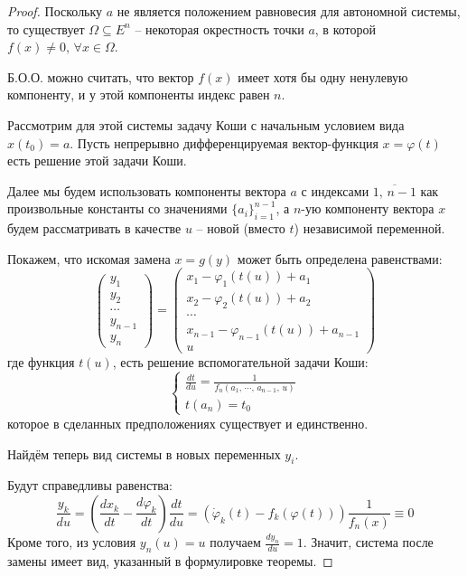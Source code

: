 \documentclass[a4paper,12pt]{article}
\renewcommand{\phi}{\ensuremath{\varphi}}
\theoremstyle{plain}
\theoremstyle{definition}
\theoremstyle{remark}
\begin{document}
\begin{proof}
	Поскольку $a$ не является положением равновесия для автономной системы, то существует $\Omega \subseteq E^n$ -- некоторая окрестность точки $a$, в которой $f(x) \neq 0,\, \forall x \in \Omega$.

	Б.О.О. можно считать, что вектор $f(x)$ имеет хотя бы одну ненулевую компоненту, и у этой компоненты индекс равен $n$.

	Рассмотрим для этой системы задачу Коши с начальным условием вида $x(t_0) = a$. Пусть непрерывно дифференцируемая вектор-функция $x = \phi(t)$ есть решение этой задачи Коши.

	Далее мы будем использовать компоненты вектора $a$ с индексами $\overline{1,\,n-1}$ как произвольные константы со значениями $\{a_i\}_{i = 1}^{n-1}$, а $n$-ую компоненту вектора $x$ будем рассматривать в качестве $u$ -- новой (вместо $t$) независимой переменной.

	Покажем, что искомая замена $x = g(y)$ может быть определена равенствами:
	\[\begin{pmatrix}
			y_1     \\
			y_2     \\
			\cdots  \\
			y_{n-1} \\
			y_n
		\end{pmatrix} = \begin{pmatrix}
			x_1 - \phi_1(t(u)) + a_1             \\
			x_2 - \phi_2(t(u)) + a_2             \\
			\cdots                               \\
			x_{n-1} - \phi_{n-1}(t(u)) + a_{n-1} \\
			u
		\end{pmatrix}\]
	где функция $t(u)$, есть решение вспомогательной задачи Коши:
	\[\begin{cases}
			\frac{dt}{du} = \frac{1}{f_n(a_1,\,\cdots,\,a_{n-1},\,u)} \\
			t(a_n) = t_0
		\end{cases}\]
	которое в сделанных предположениях существует и единственно.

	Найдём теперь вид системы в новых переменных $y_i$.

	Будут справедливы равенства:
	\[\frac{y_k}{du} = \left(\frac{dx_k}{dt} - \frac{d\phi_k}{dt}\right)\frac{dt}{du} = \left(\dot{\phi}_k(t) - f_k(\phi(t))\right) \frac{1}{f_n(x)} \equiv 0\]
	Кроме того, из условия $y_n(u) = u$ получаем $\frac{dy_n}{du} = 1$. Значит, система после замены имеет вид, указанный в формулировке теоремы.


\end{proof}
\end{document}
